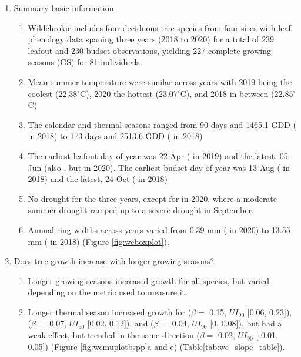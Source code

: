 \documentclass{article}\usepackage[]{graphicx}\usepackage[]{xcolor}
\begin{document}
\begin{enumerate}
\item Summary basic information
  \begin{enumerate}
  
  \item Wildchrokie includes four deciduous tree species from four sites with leaf phenology data spaning three years (2018 to 2020) for a total of 239 leafout and 
  230 budset observations, yielding 
  227 complete growing seasons (GS) for 
  81 individuals. 
    
  \item Mean summer temperature were similar across years with 2019 being the coolest (22.38$^\circ$C), 2020 the hottest (23.07$^\circ$C), and 2018 in between (22.85$^\circ$C)
    
  \item The calendar and thermal seasons ranged from 
  90 days and 
  1465.1 GDD ({\Ball} in 2018) to 
  173 days and 2513.6 GDD ({\Ainc} in 2018)

  \item The earliest leafout day of year was 
  22-Apr ({\Ainc} in
  2019) and the latest,
  05-Jun (also {\Ainc}, but in
  2020). 
  The earliest budset day of year was 
  13-Aug ({\Ball} in
  2018) and the latest, 
  24-Oct ({\Ainc} in
  2018) 
  
  \item No drought for the three years, except for in 2020, where a moderate summer drought ramped up to a severe drought in September.
  
  \item Annual ring widths across years varied from 
  0.39 mm ({\Ball} in 2020) to 
  13.55 mm ({\Bpop} in 2018) (Figure \ref{fig:wcboxplot}). 
 
\end{enumerate}

\item Does tree growth increase with longer growing seasons?
  \begin{enumerate}

  \item Longer growing seasons increased growth for all species, but varied depending on the metric used to measure it.

  \item Longer thermal season increased growth for {\Bpap} 
  ($\beta = $ 
  0.15, $UI_{90}$
  [0.06, 
  0.23]),
  {\Bpop} 
  ($\beta = $ 
  0.07, $UI_{90}$
  [0.02, 
  0.12]), and {\Ball} 
  ($\beta = $ 
  0.04, $UI_{90}$
  [0, 
  0.08]), but {\Ainc} had a weak effect, but trended in the same direction 
  ($\beta = $ 
  0.02, $UI_{90}$
  [-0.01, 
  0.05]) (Figure \ref{fig:wcmuplotbspp}a and e) (Table\ref{tab:wc_slope_table}).
 

\end{enumerate}
\end{enumerate}
\end{document}
